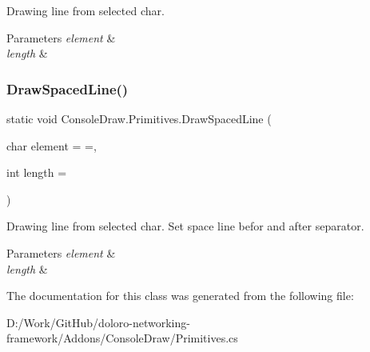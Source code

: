 Drawing line from selected char. 


\begin{DoxyParams}{Parameters}
{\em element} & \\
\hline
{\em length} & \\
\hline
\end{DoxyParams}
\mbox{\label{class_console_draw_1_1_primitives_a56f4fc0b28e3e0182208dccaf6944fdb}} 
\subsubsection{\texorpdfstring{Draw\+Spaced\+Line()}{DrawSpacedLine()}}
{\footnotesize\ttfamily static void Console\+Draw.\+Primitives.\+Draw\+Spaced\+Line (\begin{DoxyParamCaption}\item[{char}]{element = {\ttfamily \textquotesingle{}=\textquotesingle{}},  }\item[{int}]{length = {} }\end{DoxyParamCaption})\hspace{0.3cm}{\ttfamily [static]}}



Drawing line from selected char. Set space line befor and after separator. 


\begin{DoxyParams}{Parameters}
{\em element} & \\
\hline
{\em length} & \\
\hline
\end{DoxyParams}


The documentation for this class was generated from the following file\+:\begin{DoxyCompactItemize}
\item 
D\+:/\+Work/\+Git\+Hub/doloro-\/networking-\/framework/\+Addons/\+Console\+Draw/Primitives.\+cs\end{DoxyCompactItemize}
